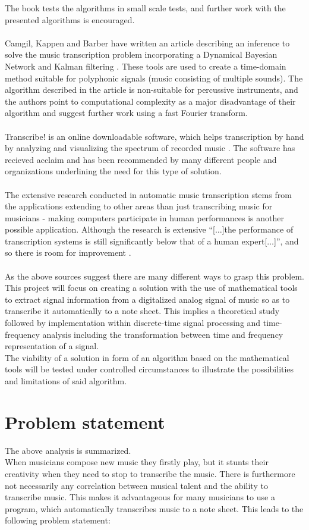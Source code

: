 The book tests the algorithms in small scale tests, and further work with the presented algorithms is encouraged.
\\ \\
Camgil, Kappen and Barber have written an article describing an inference to solve the music transcription problem incorporating a Dynamical Bayesian Network and Kalman filtering \cite{sol2}.
These tools are used to create a time-domain method suitable for polyphonic signals (music consisting of multiple sounds). 
The algorithm described in the article is non-suitable for percussive instruments, and the authors point to computational complexity as a major disadvantage of their algorithm and suggest further work using a fast Fourier transform.
\\ \\
Transcribe! is an online downloadable software, which helps transcription by hand by analyzing and visualizing the spectrum of recorded music \cite{transcribe!}. The software has recieved acclaim and has been recommended by many different people and organizations underlining the need for this type of solution.
\\ \\
The extensive research conducted in automatic music transcription stems from the applications extending to other areas than just transcribing music for musicians - making computers participate in human performances is another possible application. Although the research is extensive ``[$\ldots$]the performance of transcription systems is still significantly below that of a human expert[$\ldots$]'', and so there is room for improvement \cite{Benetos2013}.
\\ \\
As the above sources suggest there are many different ways to grasp this problem. This project will focus on creating a solution with the use of mathematical tools to extract signal information from a digitalized analog signal of music so as to transcribe it automatically to a note sheet.  
This implies a theoretical study followed by implementation within discrete-time signal processing and time-frequency analysis including the transformation between time and frequency representation of a signal.\\    
The viability of a solution in form of an algorithm based on the mathematical tools will be tested under controlled circumstances to illustrate the possibilities and limitations of said algorithm.

\section{Problem statement}
The above analysis is summarized.\\
When musicians compose new music they firstly play, but it stunts their creativity when they need to stop to transcribe the music. There is furthermore not necessarily any correlation between musical talent and the ability to transcribe music. This makes it advantageous for many musicians to use a program, which automatically transcribes music to a note sheet. This leads to the following problem statement:

